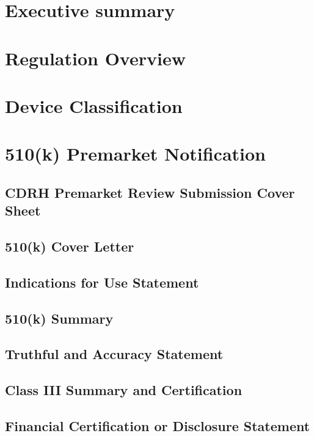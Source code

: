 \documentclass{article}
\begin{document}

\setcounter{tocdepth}{3}
\tableofcontents
\newpage

\section*{Executive summary}
\label{sec:exec-summary}

\section{Regulation Overview}
\label{sec:test-administration}

\section{Device Classification}
\label{sec:protocols}

\section{510(k) Premarket Notification}
\label{sec:protocols}
\subsection{CDRH Premarket Review Submission Cover Sheet}
\subsection{510(k) Cover Letter}
\subsection{Indications for Use Statement}
\subsection{510(k) Summary}
\subsection{Truthful and Accuracy Statement}
\subsection{Class III Summary and Certification}
\subsection{Financial Certification or Disclosure Statement}
\end{document}
